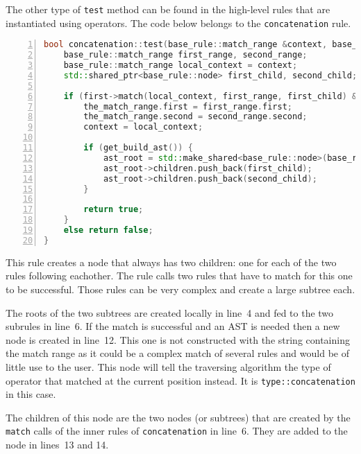 \documentclass[12pt]{article}
\begin{document}
The other type of \texttt{test} method can be found in the high-level rules that are instantiated using
operators. The code below belongs to the \texttt{concatenation} rule.

\begin{center}
	\begin{minipage}[ht]{0.95\textwidth}
		\begin{lstlisting}[language=C++, breaklines=true, numbers=left]
bool concatenation::test(base_rule::match_range &context, base_rule::match_range &the_match_range, std::shared_ptr<base_rule::node> &ast_root) {
	base_rule::match_range first_range, second_range;
	base_rule::match_range local_context = context;
	std::shared_ptr<base_rule::node> first_child, second_child;

	if (first->match(local_context, first_range, first_child) && second->match(local_context, second_range, second_child)) {
		the_match_range.first = first_range.first;
		the_match_range.second = second_range.second;
		context = local_context;

		if (get_build_ast()) {
			ast_root = std::make_shared<base_rule::node>(base_rule::node::type::concatenation);
			ast_root->children.push_back(first_child);
			ast_root->children.push_back(second_child);
		}

		return true;
	}
	else return false;
}
		\end{lstlisting}
	\end{minipage}
\end{center}

This rule creates a node that always has two children: one for each of the two rules following eachother. The
rule calls two rules that have to match for this one to be successful. Those rules can be very complex and
create a large subtree each.

The roots of the two subtrees are created locally in line~4 and fed to the two subrules in line~6. If the
match is successful and an AST is needed then a new node is created in line~12. This one is not constructed
with the string containing the match range as it could be a complex match of several rules and would be of
little use to the user. This node will tell the traversing algorithm the type of operator that matched at the
current position instead. It is \texttt{type::concatenation} in this case.

The children of this node are the two nodes (or subtrees) that are created by the \texttt{match} calls of the
inner rules of \texttt{concatenation} in line~6. They are added to the node in lines~13 and 14.
\end{document}
